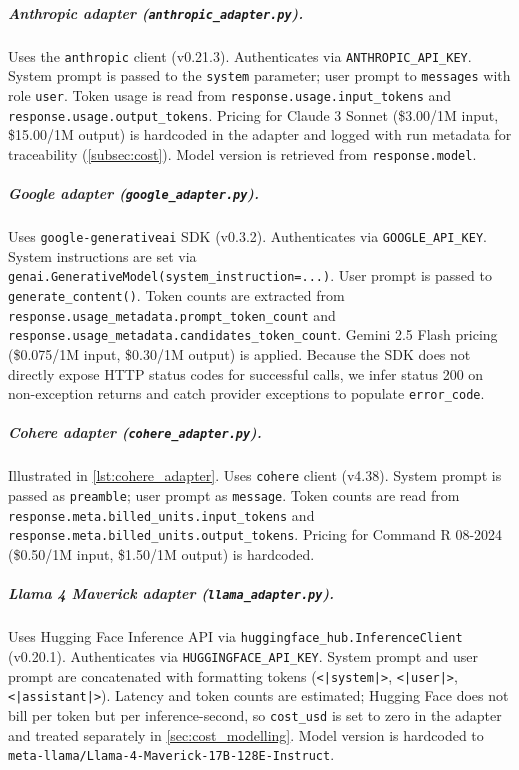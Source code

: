 \subparagraph{Anthropic adapter (\texttt{anthropic\_adapter.py}).} Uses the \texttt{anthropic} client (v0.21.3). Authenticates via \texttt{ANTHROPIC\_API\_KEY}. System prompt is passed to the \texttt{system} parameter; user prompt to \texttt{messages} with role \texttt{user}. Token usage is read from \texttt{response.usage.input\_tokens} and \texttt{response.usage.output\_tokens}. Pricing for Claude 3 Sonnet (\$3.00/1M input, \$15.00/1M output) is hardcoded in the adapter and logged with run metadata for traceability (\cref{subsec:cost}). Model version is retrieved from \texttt{response.model}.

\subparagraph{Google adapter (\texttt{google\_adapter.py}).} Uses \texttt{google-generativeai} SDK (v0.3.2). Authenticates via \texttt{GOOGLE\_API\_KEY}. System instructions are set via \texttt{genai.GenerativeModel(system\_instruction=...)}. User prompt is passed to \texttt{generate\_content()}. Token counts are extracted from \texttt{response.usage\_metadata.prompt\_token\_count} and \texttt{response.usage\_metadata.candidates\_token\_count}. Gemini 2.5 Flash pricing (\$0.075/1M input, \$0.30/1M output) is applied. Because the SDK does not directly expose HTTP status codes for successful calls, we infer status 200 on non-exception returns and catch provider exceptions to populate \texttt{error\_code}.

\subparagraph{Cohere adapter (\texttt{cohere\_adapter.py}).} Illustrated in \cref{lst:cohere_adapter}. Uses \texttt{cohere} client (v4.38). System prompt is passed as \texttt{preamble}; user prompt as \texttt{message}. Token counts are read from \texttt{response.meta.billed\_units.input\_tokens} and \texttt{response.meta.billed\_units.output\_tokens}. Pricing for Command R 08-2024 (\$0.50/1M input, \$1.50/1M output) is hardcoded.

\subparagraph{Llama 4 Maverick adapter (\texttt{llama\_adapter.py}).} Uses Hugging Face Inference API via \texttt{huggingface\_hub.InferenceClient} (v0.20.1). Authenticates via \texttt{HUGGINGFACE\_API\_KEY}. System prompt and user prompt are concatenated with formatting tokens (\texttt{<|system|>}, \texttt{<|user|>}, \texttt{<|assistant|>}). Latency and token counts are estimated; Hugging Face does not bill per token but per inference-second, so \texttt{cost\_usd} is set to zero in the adapter and treated separately in \cref{sec:cost_modelling}. Model version is hardcoded to \texttt{meta-llama/Llama-4-Maverick-17B-128E-Instruct}.

